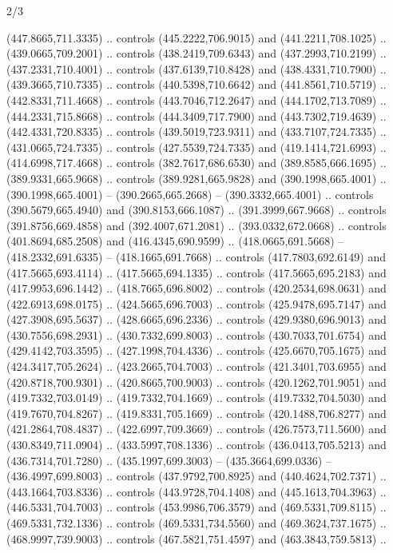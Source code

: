 \begin{flagdescription}{2/3}
\begin{scope}[xshift=0.5\flaglength,yshift=0.5\flagwidth,scale=\flagwidth/525.28]
\begin{scope}[y=0.1mm, x=0.1mm, yscale=-1,shift={(-381.5,-404)}]
\begin{scope}[shift={(5.25001,4.53053)},miter limit=4.00,line width=0.800\lw]
  (447.8665,711.3335) .. controls (445.2222,706.9015) and (441.2211,708.1025) ..
  (439.0665,709.2001) .. controls (438.2419,709.6343) and (437.2993,710.2199) ..
  (437.2331,710.4001) .. controls (437.6139,710.8428) and (438.4331,710.7900) ..
  (439.3665,710.7335) .. controls (440.5398,710.6642) and (441.8561,710.5719) ..
  (442.8331,711.4668) .. controls (443.7046,712.2647) and (444.1702,713.7089) ..
  (444.2331,715.8668) .. controls (444.3409,717.7900) and (443.7302,719.4639) ..
  (442.4331,720.8335) .. controls (439.5019,723.9311) and (433.7107,724.7335) ..
  (431.0665,724.7335) .. controls (427.5539,724.7335) and (419.1414,721.6993) ..
  (414.6998,717.4668) .. controls (382.7617,686.6530) and (389.8585,666.1695) ..
  (389.9331,665.9668) .. controls (389.9281,665.9828) and (390.1998,665.4001) ..
  (390.1998,665.4001) -- (390.2665,665.2668) -- (390.3332,665.4001) .. controls
  (390.5679,665.4940) and (390.8153,666.1087) .. (391.3999,667.9668) .. controls
  (391.8756,669.4858) and (392.4007,671.2081) .. (393.0332,672.0668) .. controls
  (401.8694,685.2508) and (416.4345,690.9599) .. (418.0665,691.5668) --
  (418.2332,691.6335) -- (418.1665,691.7668) .. controls (417.7803,692.6149) and
  (417.5665,693.4114) .. (417.5665,694.1335) .. controls (417.5665,695.2183) and
  (417.9953,696.1442) .. (418.7665,696.8002) .. controls (420.2534,698.0631) and
  (422.6913,698.0175) .. (424.5665,696.7003) .. controls (425.9478,695.7147) and
  (427.3908,695.5637) .. (428.6665,696.2336) .. controls (429.9380,696.9013) and
  (430.7556,698.2931) .. (430.7332,699.8003) .. controls (430.7033,701.6754) and
  (429.4142,703.3595) .. (427.1998,704.4336) .. controls (425.6670,705.1675) and
  (424.3417,705.2624) .. (423.2665,704.7003) .. controls (421.3401,703.6955) and
  (420.8718,700.9301) .. (420.8665,700.9003) .. controls (420.1262,701.9051) and
  (419.7332,703.0149) .. (419.7332,704.1669) .. controls (419.7332,704.5030) and
  (419.7670,704.8267) .. (419.8331,705.1669) .. controls (420.1488,706.8277) and
  (421.2864,708.4837) .. (422.6997,709.3669) .. controls (426.7573,711.5600) and
  (430.8349,711.0904) .. (433.5997,708.1336) .. controls (436.0413,705.5213) and
  (436.7314,701.7280) .. (435.1997,699.3003) -- (435.3664,699.0336) --
  (436.4997,699.8003) .. controls (437.9792,700.8925) and (440.4624,702.7371) ..
  (443.1664,703.8336) .. controls (443.9728,704.1408) and (445.1613,704.3963) ..
  (446.5331,704.7003) .. controls (453.9986,706.3579) and (469.5331,709.8115) ..
  (469.5331,732.1336) .. controls (469.5331,734.5560) and (469.3624,737.1675) ..
  (468.9997,739.9003) .. controls (467.5821,751.4597) and (463.3843,759.5813) ..

\end{scope}
\end{scope}
\end{scope}
\end{flagdescription}
